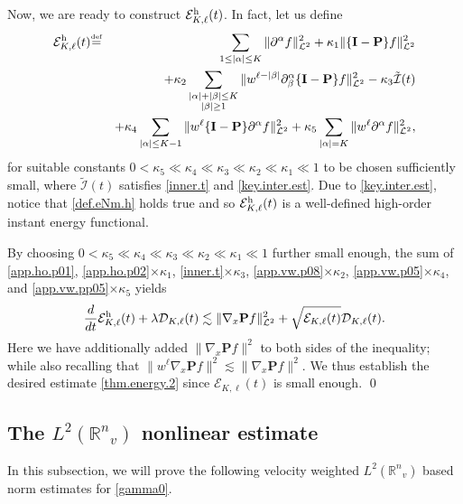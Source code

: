 \documentclass{amsart}
\numberwithin{equation}{section}
\begin{document}
Now, we are ready to construct ${\mathcal{E}}^{\rm h}_{{K}, {\ell}}(t)$. In fact, let us define
\begin{eqnarray*}
 {\mathcal{E}}^{\rm h}_{{K}, {\ell}}(t) &{\overset{\mbox{\tiny{def}}}{=}} & \sum_{1\leq |{\alpha}|\leq {K}}\|{\partial}^{\alpha} {f}\|_{{\mathcal{L}}^2}^2+\kappa_1\|\{{\mathbf{I}}-{\mathbf{P}}\}{f}\|_{{\mathcal{L}}^2}^2
 \\
 &&
 +\kappa_2\sum_{\substack{|{\alpha}|+|{\beta}|\leq {K} \\ |{\beta}|\geq 1}}  \|w^{{\ell}-|{\beta}|}{\partial}^{\alpha}_{\beta} \{{\mathbf{I}}-{\mathbf{P}}\} {f}\|_{{\mathcal{L}}^2}^2
 -\kappa_3 \tilde{\mathcal{I}}(t) 
   \\
 &&
 +
\kappa _4 \sum_{|{\alpha}| \le {K}-1} \|w^{\ell}\{{\mathbf{I}}-{\mathbf{P}}\}{\partial}^{\alpha}{f}\|_{{\mathcal{L}}^2}^2
 +
\kappa _5 \sum_{|{\alpha}| = {K}} \|w^{\ell}{\partial}^{\alpha}{f}\|_{{\mathcal{L}}^2}^2,
\end{eqnarray*}
for suitable constants $0<\kappa_5\ll\kappa_4\ll\kappa_3\ll \kappa_2\ll \kappa_1\ll 1$ to
be chosen sufficiently small, where $\tilde{\mathcal{I}}(t) $ satisfies \eqref{inner.t} and  \eqref{key.inter.est}.   Due to \eqref{key.inter.est}, notice that \eqref{def.eNm.h} holds true and so ${\mathcal{E}}^{\rm h}_{{K},{\ell}}(t)$ is a well-defined high-order instant energy functional. 

By choosing $0<\kappa_5\ll\kappa_4\ll\kappa_3\ll \kappa_2\ll \kappa_1\ll 1$
further small enough, the sum of \eqref{app.ho.p01},
\eqref{app.ho.p02}$\times \kappa_1$, \eqref{inner.t}$\times \kappa_3$,
\eqref{app.vw.p08}$\times \kappa_2$, 
\eqref{app.vw.p05}$\times \kappa_4$,
and
\eqref{app.vw.pp05}$\times \kappa_5$
 yields
\begin{equation}  \label{proof.ineq}
 \frac{d}{dt}{\mathcal{E}}_{{K},{\ell}}^{\rm h}(t)+{\lambda} {\mathcal{D}}_{{K},{\ell}}(t)
\lesssim
 \|{\nabla}_x{\mathbf{P}} {f}\|_{{\mathcal{L}}^2}^2
+
 \sqrt{{\mathcal{E}}_{{K},{\ell}}(t)}{\mathcal{D}}_{{K},{\ell}}(t).
\end{equation}
Here we have additionally added $\|{\nabla}_x{\mathbf{P}} {f}\|^2$ to both sides of the inequality; while also recalling that $\| w^{\ell} {\nabla}_x{\mathbf{P}} {f}\|^2 \lesssim\|{\nabla}_x{\mathbf{P}} {f}\|^2$.  We thus establish the desired estimate \eqref{thm.energy.2} since ${\mathcal{E}}_{{K}, {\ell}}(t)$ is small enough.  \qed

\subsection{The $L^2({{\mathbb R}^{n}}_{v})$ nonlinear estimate}\label{sec.decayEST}  
In this subsection, we will prove the following velocity weighted $L^2({{\mathbb R}^{n}}_{v})$ based norm estimates for \eqref{gamma0}.
\end{document}

